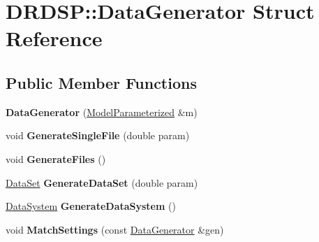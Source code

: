\hypertarget{struct_d_r_d_s_p_1_1_data_generator}{\section{D\-R\-D\-S\-P\-:\-:Data\-Generator Struct Reference}
\label{struct_d_r_d_s_p_1_1_data_generator}
}
\subsection*{Public Member Functions}
\begin{DoxyCompactItemize}
\item 
\hypertarget{struct_d_r_d_s_p_1_1_data_generator_a0e9088e0c4d4953e93a47b9bf9d7669c}{{\bfseries Data\-Generator} (\hyperlink{struct_d_r_d_s_p_1_1_model_parameterized}{Model\-Parameterized} \&m)}\label{struct_d_r_d_s_p_1_1_data_generator_a0e9088e0c4d4953e93a47b9bf9d7669c}

\item 
\hypertarget{struct_d_r_d_s_p_1_1_data_generator_a63fda985506ece1413442a01802a0ac8}{void {\bfseries Generate\-Single\-File} (double param)}\label{struct_d_r_d_s_p_1_1_data_generator_a63fda985506ece1413442a01802a0ac8}

\item 
\hypertarget{struct_d_r_d_s_p_1_1_data_generator_af380aae927456c37efd68a2b2ba9ea4a}{void {\bfseries Generate\-Files} ()}\label{struct_d_r_d_s_p_1_1_data_generator_af380aae927456c37efd68a2b2ba9ea4a}

\item 
\hypertarget{struct_d_r_d_s_p_1_1_data_generator_a76849673b1f778bc3187edf4f93dd3f9}{\hyperlink{struct_d_r_d_s_p_1_1_data_set}{Data\-Set} {\bfseries Generate\-Data\-Set} (double param)}\label{struct_d_r_d_s_p_1_1_data_generator_a76849673b1f778bc3187edf4f93dd3f9}

\item 
\hypertarget{struct_d_r_d_s_p_1_1_data_generator_a1d37b6ff27ff19c6709b4b8c3b60ffdf}{\hyperlink{struct_d_r_d_s_p_1_1_data_system}{Data\-System} {\bfseries Generate\-Data\-System} ()}\label{struct_d_r_d_s_p_1_1_data_generator_a1d37b6ff27ff19c6709b4b8c3b60ffdf}

\item 
\hypertarget{struct_d_r_d_s_p_1_1_data_generator_a6eed5c243e6a56c95529e9f94d93f990}{void {\bfseries Match\-Settings} (const \hyperlink{struct_d_r_d_s_p_1_1_data_generator}{Data\-Generator} \&gen)}\label{struct_d_r_d_s_p_1_1_data_generator_a6eed5c243e6a56c95529e9f94d93f990}

\end{DoxyCompactItemize}
